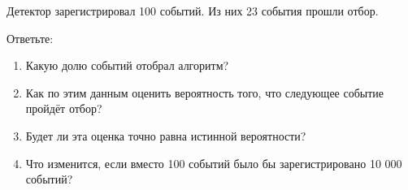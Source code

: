\documentclass[
  russian,
  11pt,
  a4paper,
  open=any]{scrbook}
\providecommand{\tightlist}{%
  \setlength{\itemsep}{0pt}\setlength{\parskip}{0pt}}
\begin{document}
\begin{semanticpdfbox}[colback=BookCoralSoft,borderline west={1.2mm}{0pt}{BookCoral}]

\par\nopagebreak[4]\vspace{1.2mm}

Детектор зарегистрировал 100 событий. Из них 23 события прошли отбор.

Ответьте:

\begin{enumerate}
\def\labelenumi{\arabic{enumi}.}
\tightlist
\item
  Какую долю событий отобрал алгоритм?
\item
  Как по этим данным оценить вероятность того, что следующее событие
  пройдёт отбор?
\item
  Будет ли эта оценка точно равна истинной вероятности?
\item
  Что изменится, если вместо 100 событий было бы зарегистрировано 10 000
  событий?
\end{enumerate}

\end{semanticpdfbox}
\end{document}
